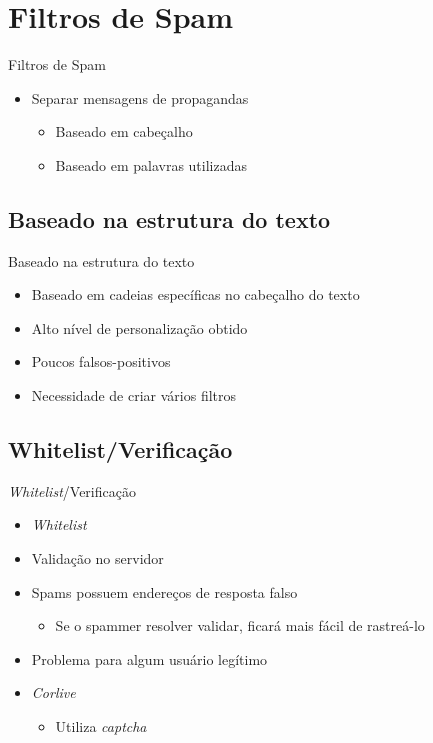 \documentclass[dvipdfm]{beamer}
\begin{document}
\section{Filtros de Spam}
\begin{frame}{Filtros de Spam}
	\begin{itemize}
		\item Separar mensagens de propagandas
		\begin{itemize}
			\item Baseado em cabeçalho
			\item Baseado em palavras utilizadas
		\end{itemize}
	\end{itemize}
\end{frame}

\subsection{Baseado na estrutura do texto} 
\begin{frame}{Baseado na estrutura do texto}
	\begin{itemize}
		\item Baseado em cadeias específicas no cabeçalho do texto
		\item Alto nível de personalização obtido
		\item Poucos falsos-positivos
		\item Necessidade de criar vários filtros
	\end{itemize}
\end{frame}

\subsection{Whitelist/Verificação} 
\begin{frame}{\emph{Whitelist}/Verificação}
	\begin{itemize}
		\item \emph{Whitelist}
		\item Validação no servidor
		\item Spams possuem endereços de resposta falso
		\begin{itemize}
			\item Se o spammer resolver validar, ficará mais fácil de rastreá-lo
		\end{itemize}
		\item Problema para algum usuário legítimo
		\item \emph{Corlive}
		\begin{itemize}
			\item Utiliza \emph{captcha}
		\end{itemize}
	\end{itemize}
\end{frame}
\end{document}
